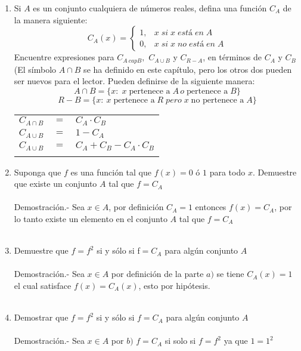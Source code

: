 \begin{teo}
\begin{enumerate}[\bfseries a)]
\item Si $A$ es un conjunto cualquiera de números reales, defina una función $C_A$ de la manera siguiente:
\begin{equation}
C_A(x) = \left\lbrace
\begin{array}{rr}
1, & x \; si \; x \; está \; en \; A\\
0, & x \; si \; x \; no \; está \; en \; A
\end{array}
\right.
\end{equation}
Encuentre expresiones para $C_{A\ cap B},$   $C_{A\cup B}$ \; y \; $C_{R-A}$, en términos de $C_A$ \; y \; $C_B$ (El símbolo $A \cap B$ se ha definido en este capítulo, pero los otros dos pueden ser nuevos para el lector. Pueden definirse de la siguiente manera:
$$A \cap B = \lbrace x: \; x \; \mbox{pertenece a} \; A \, o \; \mbox{pertenece a} \; B \rbrace$$
$$R - B = \lbrace x: \: x \; \mbox{pertenece a} \; R \; pero \; x \; \mbox{no pertenece a} \; A \rbrace$$
\begin{center}
\begin{tabular}{r c l}
$C_{A \cap B}$&$=$&$C_A \cdot C_B$\\
$C_{A \cup B}$&$=$&$1 - C_A$\\
$C_{A \cup B}$&$=$&$C_A + C_B - C_A \cdot C_B$\\\\
\end{tabular}
\end{center}

\item Suponga que $f$ es una función tal que $f(x) = 0$ ó $1$ para todo $x$. Demuestre que existe un
conjunto $A$ tal que $f = C_A$\\\\
Demostración.- \;  Sea $x \in A$, por definición $C_A = 1$ entonces $f(x)=C_A$, por lo tanto existe un elemento en el conjunto $A$ tal que $f=C_A$\\\\

\item  Demuestre que $f = f^2$ si y sólo si f$ = C_A$ para algún conjunto $A$\\\\
Demostración.- \; Sea $x\in A$ por definición de la parte $a)$ se tiene $C_A(x)=1$ el cual satisface $f(x)=C_A(x)$, esto por hipótesis.\\\\

\item Demostrar que $f=f^2$ si y sólo si $f=C_A$ para algún conjunto $A$\\\\
Demostración.- \; Sea $x \in A$ por $b)$ $f=C_A$ si solo si $f=f^2$ ya que $1=1^2$\\\\
\end{enumerate}
\end{teo}

